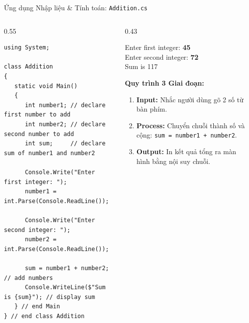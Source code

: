 \documentclass[aspectratio=169, 10pt]{beamer}
\begin{document}
\begin{frame}[fragile]{Ứng dụng Nhập liệu \& Tính toán: \texttt{Addition.cs}}
  \begin{columns}[T]
    \begin{column}{0.55\textwidth}
      \begin{tcolorbox}[colback=CodeBg,colframe=UniNavy,title=\textbf{Addition.cs (Fig. 3.14)},fonttitle=\small\bfseries]
\begin{lstlisting}
using System;

class Addition
{
   static void Main()
   {
      int number1; // declare first number to add
      int number2; // declare second number to add
      int sum;     // declare sum of number1 and number2

      Console.Write("Enter first integer: ");
      number1 = int.Parse(Console.ReadLine());

      Console.Write("Enter second integer: ");
      number2 = int.Parse(Console.ReadLine());

      sum = number1 + number2; // add numbers
      Console.WriteLine($"Sum is {sum}"); // display sum
   } // end Main
} // end class Addition
\end{lstlisting}
      \end{tcolorbox}
    \end{column}

    \begin{column}{0.43\textwidth}
      \begin{tcolorbox}[colback=UniDark,colframe=black,title=\textbf{Màn hình Console Tương tác},fonttitle=\scriptsize\bfseries]
        \color{white}\ttfamily\small
        Enter first integer: \textbf{45}\\
        Enter second integer: \textbf{72}\\
        Sum is 117
      \end{tcolorbox}

      \begin{exampleblock}{\textbf{Quy trình 3 Giai đoạn:}}
        \begin{enumerate}\small
          \item \textbf{Input:} Nhắc người dùng gõ 2 số từ bàn phím.
          \item \textbf{Process:} Chuyển chuỗi thành số và cộng: \texttt{sum = number1 + number2}.
          \item \textbf{Output:} In kết quả tổng ra màn hình bằng nội suy chuỗi.
        \end{enumerate}
      \end{exampleblock}
    \end{column}
  \end{columns}
\end{frame}
\end{document}
